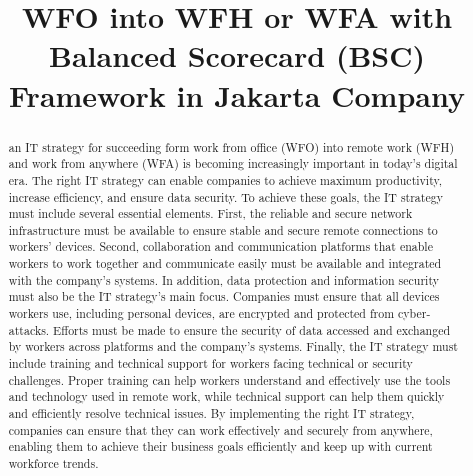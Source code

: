 \documentclass[conference]{IEEEtran}
\begin{document}
\newcommand{\al}[1]{{\textbf{\color{blue} Alfa: #1}}}

\title{WFO into WFH or WFA with Balanced Scorecard (BSC) Framework in Jakarta Company\\
{ \textsuperscript{}}
}

\author{
\and
{}


}

\maketitle

\begin{abstract}
an IT strategy for succeeding form work from office (WFO) into remote work (WFH) and work from anywhere (WFA) is becoming increasingly important in today's digital era. The right IT strategy can enable companies to achieve maximum productivity, increase efficiency, and ensure data security. To achieve these goals, the IT strategy must include several essential elements. First, the reliable and secure network infrastructure must be available to ensure stable and secure remote connections to workers' devices. Second, collaboration and communication platforms that enable workers to work together and communicate easily must be available and integrated with the company's systems. In addition, data protection and information security must also be the IT strategy's main focus. Companies must ensure that all devices workers use, including personal devices, are encrypted and protected from cyber-attacks. Efforts must be made to ensure the security of data accessed and exchanged by workers across platforms and the company's systems. Finally, the IT strategy must include training and technical support for workers facing technical or security challenges. Proper training can help workers understand and effectively use the tools and technology used in remote work, while technical support can help them quickly and efficiently resolve technical issues. By implementing the right IT strategy, companies can ensure that they can work effectively and securely from anywhere, enabling them to achieve their business goals efficiently and keep up with current workforce trends.

\end{abstract}
\end{document}
